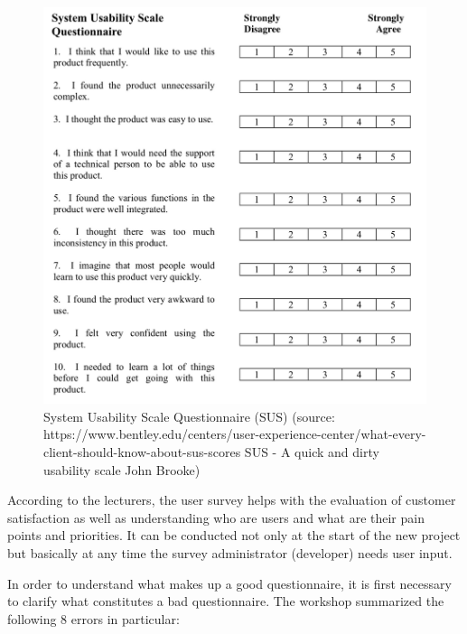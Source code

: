 \documentclass[a4paper,10pt,twoside]{article}
\begin{document}
\vspace{0.3cm}
\begin{figure}[hbt!] 
\begin{center}
\includegraphics[width=14cm]{../pictures/sus.png} 
\caption[System Usability Scale Questionnaire (SUS) ]{System Usability Scale Questionnaire (SUS) (source: https://www.bentley.edu/centers/user-experience-center/what-every-client-should-know-about-sus-scores SUS - A quick and dirty usability scale John Brooke)}
\label{fig:sus}
\end{center}
\end{figure}

\newpage
\noindent According to the lecturers, the user survey helps with the evaluation of customer satisfaction as well as understanding who are users and what are their pain points and priorities. It can be conducted not only at the start of the new project but basically at any time the survey administrator (developer) needs user input.

In order to understand what makes up a good questionnaire, it is first necessary to clarify what constitutes a bad questionnaire. The workshop summarized the following 8 errors in particular:
\end{document}
